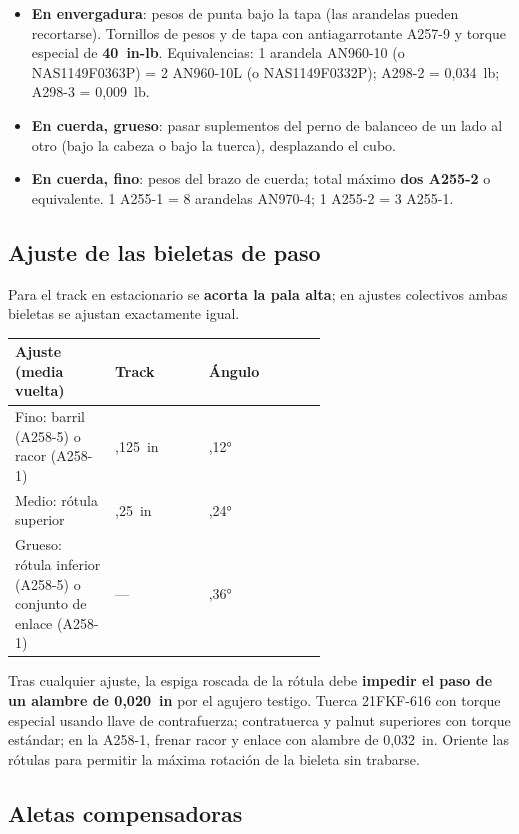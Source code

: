 \begin{itemize}
\item \textbf{En envergadura}: pesos de punta bajo la tapa (las arandelas pueden recortarse). Tornillos de pesos y de tapa con antiagarrotante A257-9 y torque especial de \textbf{40~in-lb}. Equivalencias: 1 arandela AN960-10 (o NAS1149F0363P) = 2 AN960-10L (o NAS1149F0332P); A298-2 = 0,034~lb; A298-3 = 0,009~lb.
\item \textbf{En cuerda, grueso}: pasar suplementos del perno de balanceo de un lado al otro (bajo la cabeza o bajo la tuerca), desplazando el cubo.
\item \textbf{En cuerda, fino}: pesos del brazo de cuerda; total máximo \textbf{dos A255-2} o equivalente. 1 A255-1 = 8 arandelas AN970-4; 1 A255-2 = 3 A255-1.
\end{itemize}

\subsection{Ajuste de las bieletas de paso}

Para el track en estacionario se \textbf{acorta la pala alta}; en ajustes colectivos ambas bieletas se ajustan exactamente igual.

\begin{center}
\small
\begin{tabularx}{\linewidth}{@{}>{\raggedright\arraybackslash}p{0.32\linewidth}>{\raggedright\arraybackslash}p{0.3\linewidth}>{\raggedright\arraybackslash}X@{}}
\toprule
Ajuste (media vuelta) & Track & Ángulo \\
\midrule
Fino: barril (A258-5) o racor (A258-1) & 0,125~in & 0,12° \\
Medio: rótula superior & 0,25~in & 0,24° \\
Grueso: rótula inferior (A258-5) o conjunto de enlace (A258-1) & --- & 0,36° \\
\bottomrule
\end{tabularx}
\end{center}

Tras cualquier ajuste, la espiga roscada de la rótula debe \textbf{impedir el paso de un alambre de 0,020~in} por el agujero testigo. Tuerca 21FKF-616 con torque especial usando llave de contrafuerza; contratuerca y palnut superiores con torque estándar; en la A258-1, frenar racor y enlace con alambre de 0,032~in. Oriente las rótulas para permitir la máxima rotación de la bieleta sin trabarse.

\subsection{Aletas compensadoras}


